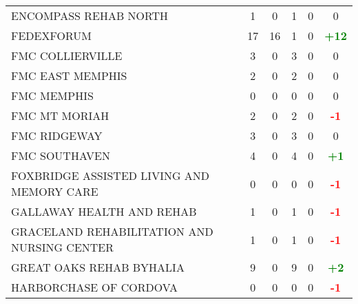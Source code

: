 \documentclass{article}
\begin{document}
\begin{longtable}{l|cccc|c}
    
        ENCOMPASS REHAB NORTH & 1 & 0 & 1 & 0 & 0 \\
    

    
        FEDEXFORUM & 17 & 16 & 1 & 0 & \textcolor{green}{\textbf{+12}} \\
    

    
        FMC COLLIERVILLE & 3 & 0 & 3 & 0 & 0 \\
    

    
        FMC EAST MEMPHIS & 2 & 0 & 2 & 0 & 0 \\
    

    
        FMC MEMPHIS & 0 & 0 & 0 & 0 & 0 \\
    

    
        FMC MT MORIAH & 2 & 0 & 2 & 0 & \textcolor{red}{\textbf{-1}} \\
    

    
        FMC RIDGEWAY & 3 & 0 & 3 & 0 & 0 \\
    

    
        FMC SOUTHAVEN & 4 & 0 & 4 & 0 & \textcolor{green}{\textbf{+1}} \\
    

    
        FOXBRIDGE ASSISTED LIVING AND MEMORY CARE & 0 & 0 & 0 & 0 & \textcolor{red}{\textbf{-1}} \\
    

    
        GALLAWAY HEALTH AND REHAB & 1 & 0 & 1 & 0 & \textcolor{red}{\textbf{-1}} \\
    

    
        GRACELAND REHABILITATION AND NURSING CENTER & 1 & 0 & 1 & 0 & \textcolor{red}{\textbf{-1}} \\
    

    
        GREAT OAKS REHAB BYHALIA & 9 & 0 & 9 & 0 & \textcolor{green}{\textbf{+2}} \\
    

    
        HARBORCHASE OF CORDOVA & 0 & 0 & 0 & 0 & \textcolor{red}{\textbf{-1}} \\
    


\end{longtable}
\end{document}
